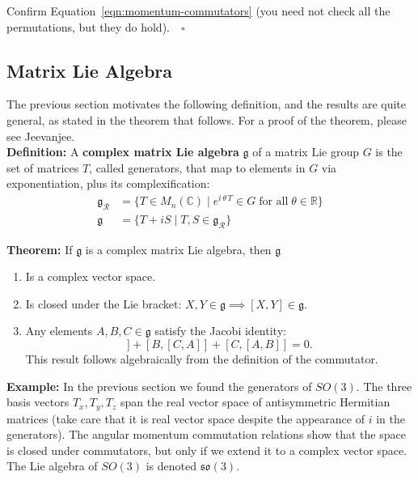 \documentclass[12pt]{article}
\begin{document}
\exercise Confirm Equation~\ref{eqn:momentum-commutators} (you need
not check all the permutations, but they do hold).$\quad
\square$\\[5pt]

\subsection*{Matrix Lie Algebra}

The previous section motivates the following definition, and the
results are quite general, as stated in the theorem that follows.  For
a proof of the theorem, please see Jeevanjee.\\[5pt]

\noindent\textbf{Definition:} A \textbf{complex matrix Lie algebra}
$\mathfrak{g}$ of a matrix Lie group $G$ is the set of matrices $T$,
called generators, that map to elements in $G$ via exponentiation, plus its complexification:
\begin{align*}
  \mathfrak{g}_\mathcal{R} &= \bigl\{T \in M_n(\mathbb{C}) \mid e^{i \,
    \theta \, T} \in G \;\text{for all}\; \theta \in
  \mathbb{R}\bigr\}\\
  \mathfrak{g} &= \{T+iS \mid T,S \in \mathfrak{g}_\mathcal{R}\}
\end{align*}

\noindent\textbf{Theorem:} If $\mathfrak{g}$ is a complex matrix Lie algebra,
then $\mathfrak{g}$
\begin{enumerate}
\item Is a complex vector space.
\item Is closed under the Lie bracket: $X,Y \in \mathfrak{g} \implies [X,Y] \in \mathfrak{g}$.
\item Any elements $A,B,C \in \mathfrak{g}$ satisfy the Jacobi identity:
  \begin{equation*}
    [A,[B,C]] + [B,[C,A]] + [C,[A,B]] = 0.
  \end{equation*}
  This result follows algebraically from the definition of the commutator.
\end{enumerate}

\noindent\textbf{Example:} In the previous section we found the
generators of $SO(3)$.  The three basis vectors ${T_x, T_y, T_z}$ span
the real vector space of antisymmetric Hermitian matrices (take care
that it is real vector space despite the appearance of $i$ in the
generators).  The angular momentum commutation relations show that the
space is closed under commutators, but only if we extend it to a
complex vector space.  The Lie algebra of $SO(3)$ is denoted
$\mathfrak{so}(3)$.\\[5pt]
\end{document}
